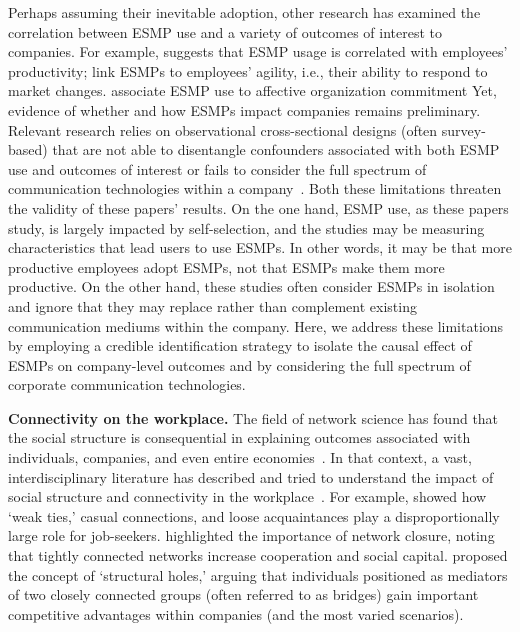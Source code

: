 Perhaps assuming their inevitable adoption, other research has examined the correlation between ESMP use and a variety of outcomes of interest to companies.
For example, \citet{aboelmaged2018knowledge} suggests that ESMP usage is correlated with employees' productivity;
\citet{pitafi2018investigating} link ESMPs to employees' agility, i.e., their ability to respond to market changes.
\citet{luo2018can} associate ESMP use to affective organization commitment
Yet, evidence of whether and how ESMPs impact companies remains preliminary. 
Relevant research relies on observational cross-sectional designs (often survey-based) that are not able to disentangle confounders associated with both ESMP use and outcomes of interest or fails to consider the full spectrum of communication technologies within a company~\cite{azaizah2018impact}.
Both these limitations threaten the validity of these papers' results. 
On the one hand, ESMP use, as these papers study, is largely impacted by self-selection, and the studies may be measuring characteristics that lead users to use ESMPs.
In other words, it may be that more productive employees adopt ESMPs, not that ESMPs make them more productive.
On the other hand, these studies often consider ESMPs in isolation and ignore that they may replace rather than complement existing communication mediums within the company.
Here, we address these limitations by employing a credible identification strategy to isolate the causal effect of ESMPs on company-level outcomes and by considering the full spectrum of corporate communication technologies. 

\vspace{0.5mm}
\noindent
\textbf{Connectivity on the workplace.}
The field of network science has found that the social structure is consequential in explaining outcomes associated with individuals, companies, and even entire economies~\cite{watts1999small,barabasi2014linked}. 
In that context, a vast, interdisciplinary literature has described and tried to understand the impact of social structure and connectivity in the workplace~\cite{reagans2003network,raub1990reputation,soda2021networks}.
For example, \citet{granovetter1973strength} showed how `weak ties,' casual connections, and loose acquaintances play a disproportionally large role for job-seekers.
\citet{coleman1988social} highlighted the importance of network closure, noting that tightly connected networks increase cooperation and social capital.
\citet{burt_structural_1992} proposed the concept of `structural holes,' arguing that individuals positioned as mediators of two closely connected groups  (often referred to as bridges) gain important competitive advantages within companies (and the most varied scenarios).

